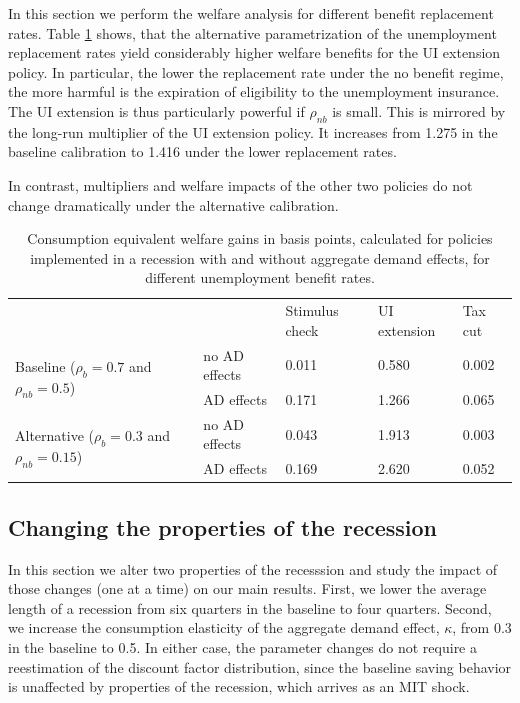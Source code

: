 \documentclass[../HAFiscal]{subfiles}
\begin{document}
In this section we perform the welfare analysis for different benefit replacement rates. Table \ref{tab:robustness_benefit_results} shows, that the alternative parametrization of the unemployment replacement rates yield considerably higher welfare benefits for the UI extension policy. In particular, the lower the replacement rate under the no benefit regime, the more harmful is the expiration of eligibility to the unemployment insurance. The UI extension is thus particularly powerful if $\rho_{nb}$ is small. This is mirrored by the long-run multiplier of the UI extension policy. It increases from 1.275 in the baseline calibration to 1.416 under the lower replacement rates.

In contrast, multipliers and welfare impacts of the other two policies do not change dramatically under the alternative calibration. 


\begin{table}[]
	\begin{center}
		\begin{tabular}{@{}lllll@{}}
			\toprule
			&                    & Stimulus check & UI extension & Tax cut \\ \cmidrule(l){1-5} 
			\multirow{2}{*}{Baseline  ($\rho_{b}=0.7$ and $\rho_{nb}=0.5$)} 	& no AD effects & 0.011          & 0.580        & 0.002   \\
																				& AD effects    & 0.171          & 1.266        & 0.065   \\
			\multirow{2}{*}{Alternative  ($\rho_{b}=0.3$ and $\rho_{nb}=0.15$)} & no AD effects & 0.043          & 1.913        & 0.003   \\
																				& AD effects    & 0.169          & 2.620        & 0.052   \\ \cmidrule(l){1-5} 
		\end{tabular}
		\caption{Consumption equivalent welfare gains in basis points, calculated for policies implemented in a recession with and without aggregate demand effects, for different unemployment benefit rates.}
		\label{tab:robustness_benefit_results}
	\end{center}
\end{table}




\FloatBarrier
\subsection{Changing the properties of the recession}

In this section we alter two properties of the recesssion and study the impact of those changes (one at a time) on our main results. First, we lower the average length of a recession from six quarters in the baseline to four quarters. Second, we increase the consumption elasticity of the aggregate demand effect, $\kappa$, from 0.3 in the baseline to 0.5. In either case, the parameter changes do not require a reestimation of the discount factor distribution, since the baseline saving behavior is unaffected by properties of the recession, which arrives as an MIT shock. 
\end{document}
